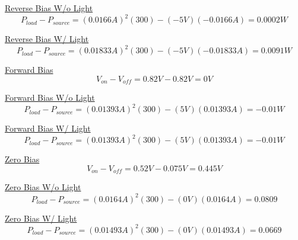 \underline{Reverse Bias W/o Light}\\
\begin{equation}
\label{eq:Reverse Bias W/o Light}
{P_{load}}-{P_{source}} = {(0.0166A)^{2}(300)}-{(-5V)(-0.0166A)} = 0.0002W
\end{equation}

\underline{Reverse Bias W/ Light}\\
\begin{equation}
\label{eq:Reverse Bias W/ Light}
{P_{load}}-{P_{source}} = (0.01833A)^{2}(300)-{(-5V)(-0.01833A)} = 0.0091W 
\end{equation}

\underline{Forward Bias}\\
\begin{equation}
\label{eq:Forward Bias}
{V_{on}}-{V_{off}} = 0.82V - 0.82V = 0V 
\end{equation}

\underline{Forward Bias W/o Light}\\
\begin{equation}
\label{eq:Forward Bias W/o Light}
{P_{load}}-{P_{source}} = (0.01393A)^{2}(300)-{(5V)(0.01393A)} = -0.01W
\end{equation}

\underline{Forward Bias W/ Light}\\
\begin{equation}
\label{eq:Forward Bias W/ Light}
{P_{load}}-{P_{source}} = (0.01393A)^{2}(300)-{(5V)(0.01393A)} = -0.01W
\end{equation}

\underline{Zero Bias}\\
\begin{equation}
\label{eq:Zero Bias}
{V_{on}}-{V_{off}} = 0.52V - 0.075V = 0.445V
\end{equation}

\underline{Zero Bias W/o Light}\\
\begin{equation}
\label{eq:Zero Bias W/o Light}
{P_{load}}-{P_{source}} = (0.0164A)^{2}(300)-{(0V)(0.0164A)} = 0.0809 
\end{equation}

\underline{Zero Bias W/ Light}\\
\begin{equation}
\label{eq:Zero Bias W/ Light}
{P_{load}}-{P_{source}} = (0.01493A)^{2}(300)-{(0V)(0.01493A)} = 0.0669
\end{equation}




